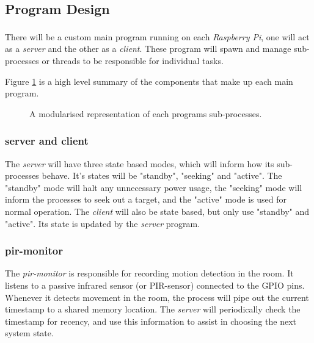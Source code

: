 \documentclass[11pt,a4paper,titlepage]{report}
\newcommand{\rpi}{\textit{Raspberry Pi\textsuperscript{\textregistered}}}
\begin{document}
\subsection{Program Design}

There will be a custom main program running on each \rpi, one will act as a \textit{server} and the other as a \textit{client}. These program will spawn and manage sub-processes or threads to be responsible for individual tasks.

Figure \ref{fig:processes} is a high level summary of the components that make up each main program.

\begin{figure}
\begin{multicols}{2}
\columnbreak
{}
\end{multicols}
\caption{A modularised representation of each programs sub-processes.}\label{fig:processes}
\end{figure}

\subsubsection{server and client}


The \textit{server} will have three state based modes, which will inform how its sub-processes behave. It's states will be "standby", "seeking" and "active". The "standby" mode will halt any unnecessary power usage, the "seeking" mode will inform the processes to seek out a target, and the "active" mode is used for normal operation. 
The \textit{client} will also be state based, but only use "standby" and "active". Its state is updated by the \textit{server} program.


\subsubsection{pir-monitor}

The \textit{pir-monitor} is responsible for recording motion detection in the room. It listens to a passive infrared sensor (or PIR-sensor) connected to the GPIO pins. Whenever it detects movement in the room, the process will pipe out the current timestamp to a shared memory location. The \textit{server} will periodically check the timestamp for recency, and use this information to assist in choosing the next system state.
\end{document}
